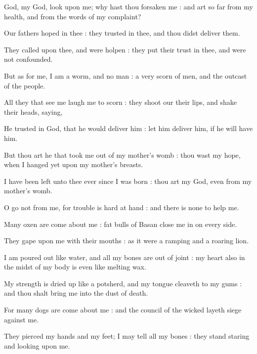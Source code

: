 

 God, my God, look upon me; why hast thou forsaken me : and art so far from my health, and from the words of my complaint?\par
{}
Our fathers hoped in thee : they trusted in thee, and thou didst deliver them.\par
{}They called upon thee, and were holpen : they put their trust in thee, and were not confounded.\par
{}But as for me, I am a worm, and no man : a very scorn of men, and the outcast of the people.\par
{}All they that see me laugh me to scorn : they shoot our their lips, and shake their heads, saying,\par
{}He trusted in God, that he would deliver him : let him deliver him, if he will have him.\par
{}But thou art he that took me out of my mother's womb : thou wast my hope, when I hanged yet upon my mother's breasts.\par
{}I have been left unto thee ever since I was born : thou art my God, even from my mother's womb.\par
{}O go not from me, for trouble is hard at hand : and there is none to help me.\par
{}Many oxen are come about me : fat bulls of Basan close me in on every side.\par
{}They gape upon me with their mouths : as it were a ramping and a roaring lion.\par
{}I am poured out like water, and all my bones are out of joint : my heart also in the midst of my body is even like melting wax.\par
{}My strength is dried up like a potsherd, and my tongue cleaveth to my gums : and thou shalt bring me into the dust of death.\par
{}For many dogs are come about me : and the council of the wicked layeth siege against me.\par
{}They pierced my hands and my feet; I may tell all my bones : they stand staring and looking upon me.\par
